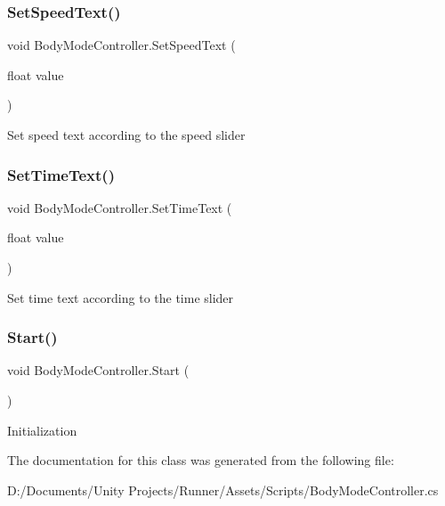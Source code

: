 \subsubsection{\texorpdfstring{Set\+Speed\+Text()}{SetSpeedText()}}
{\footnotesize\ttfamily void Body\+Mode\+Controller.\+Set\+Speed\+Text (\begin{DoxyParamCaption}\item[{float}]{value }\end{DoxyParamCaption})}

Set speed text according to the speed slider \mbox{\label{class_body_mode_controller_aa68961f51610549f3d0adf6b67403d92}} 
\subsubsection{\texorpdfstring{Set\+Time\+Text()}{SetTimeText()}}
{\footnotesize\ttfamily void Body\+Mode\+Controller.\+Set\+Time\+Text (\begin{DoxyParamCaption}\item[{float}]{value }\end{DoxyParamCaption})}

Set time text according to the time slider \mbox{\label{class_body_mode_controller_a0f78a4335940305ccea1b96751afe664}} 
\subsubsection{\texorpdfstring{Start()}{Start()}}
{\footnotesize\ttfamily void Body\+Mode\+Controller.\+Start (\begin{DoxyParamCaption}{ }\end{DoxyParamCaption})\hspace{0.3cm}{\ttfamily [private]}}

Initialization 

The documentation for this class was generated from the following file\+:\begin{DoxyCompactItemize}
\item 
D\+:/\+Documents/\+Unity Projects/\+Runner/\+Assets/\+Scripts/Body\+Mode\+Controller.\+cs\end{DoxyCompactItemize}
